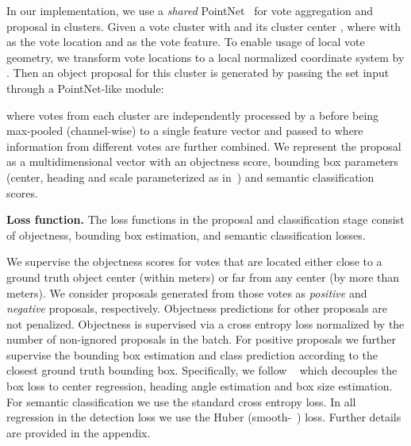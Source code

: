 \documentclass[10pt,twocolumn,letterpaper]{article}
\begin{document}
In our implementation, we use a \emph{shared} PointNet~\cite{qi2017pointnet} for vote aggregation and proposal in clusters. Given a vote cluster  with  and its cluster center , where  with  as the vote location and  as the vote feature. To enable usage of local vote geometry, we transform vote locations to a local normalized coordinate system by . Then an object proposal for this cluster  is generated by passing the set input through a PointNet-like module:



\noindent
where votes from each cluster are independently processed by a  before being max-pooled (channel-wise) to a single feature vector and passed to  where information from different votes are further combined. We represent the proposal  as a multidimensional vector with an objectness score, bounding box parameters (center, heading and scale parameterized as in~\cite{qi2018frustum}) and semantic classification scores.













\smallskip\noindent\textbf{Loss function.}
The loss functions in the proposal and classification stage consist of objectness, bounding box estimation, and semantic classification losses.



We supervise the objectness scores for votes that are located either close to a ground truth object center (within  meters) or far from any center (by more than  meters). We consider proposals generated from those votes as \textit{positive} and \textit{negative} proposals, respectively. Objectness predictions for other proposals are not penalized. Objectness is supervised via a cross entropy loss normalized by the number of non-ignored proposals in the batch. For positive proposals we further supervise the bounding box estimation and class prediction according to the closest ground truth bounding box. Specifically, we follow ~\cite{qi2018frustum} which decouples the box loss to center regression, heading angle estimation and box size estimation. For semantic classification we use the standard cross entropy loss. In all regression in the detection loss we use the Huber (smooth-~\cite{ren2015faster}) loss. Further details are provided in the appendix. 
\end{document}
